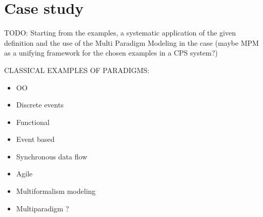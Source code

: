 \section{Case study}

TODO: Starting from the examples, a systematic application of the given definition and the use of the Multi Paradigm Modeling in the case (maybe MPM as a unifying framework for the chosen examples in a CPS system?)

CLASSICAL EXAMPLES OF PARADIGMS:
\begin{itemize}
    \item OO
    \item Discrete events
    \item Functional
    \item Event based
    \item Synchronous data flow
    \item Agile
    \item Multiformalism modeling
    \item Multiparadigm ?
\end{itemize}